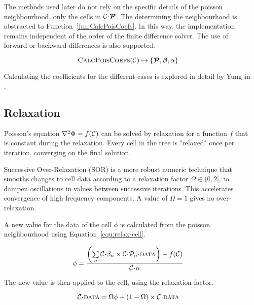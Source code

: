 \documentclass[twoside]{IIBproject}
\newcommand{\vect} [1] {\bm{#1}}
\newcommand{\acc}{{\mkern 0.5mu\cdot\mkern 0.5mu}}
\numberwithin{figure}{section}
\begin{document}
        The methods used later do not rely on the specific details of the poisson neighbourhood, only the cells in $\mathcal{C}\acc\vect{\mathcal{P}}$. The determining the neighbourhood is abstracted to Function~\ref{fun:CalcPoisCoefs}. In this way, the implementation remains independent of the order of the finite difference solver. The use of forward or backward differences is also supported.

        \begin{equation}
            \label{fun:CalcPoisCoefs}
            \textproc{CalcPoisCoefs}(\mathcal{C}) \mapsto \{ \vect{\mathcal{P}}, \vect{\beta}, \alpha \}
        \end{equation}

        Calculating the coefficients for the different cases is explored in detail by Yung in \cite{Yung2010}. 



    \subsection{Relaxation} %
        \label{sec:relaxation}

        Poisson's equation $\laplacian{\Phi}=f(\mathcal{C})$ can be solved by relaxation for a function $f$ that is constant during the relaxation. Every cell in the tree is "relaxed" once per iteration, converging on the final solution. 

        Successive Over-Relaxation (SOR) is a more robust numeric technique that smooths changes to cell data according to a relaxation factor $\Omega \in (0,2]$, to dampen oscillations in values between successive iterations. This accelerates convergence of high frequency components. A value of $\Omega=1$ gives no over-relaxation. 

        A new value for the data of the cell $\phi$ is calculated from the poisson neighbourhood using Equation~\ref{equ:relax-cell}. 

        \begin{equation}
            \phi = \frac{ \left( \sum\limits_n \mathcal{C}\acc\beta_n \times \mathcal{C}\acc\mathcal{P}_n\acc\textproc {data} \right)-f(\mathcal{C})} { \mathcal{C}\acc\alpha }
            \label{equ:relax-cell}
        \end{equation}

        The new value is then applied to the cell, using the relaxation factor. 

        \begin{equation}
            \mathcal{C}\acc\textproc{data} = \Omega\phi + (1-\Omega)\times\mathcal{C}\acc\textproc{data}
        \end{equation}
\end{document}
